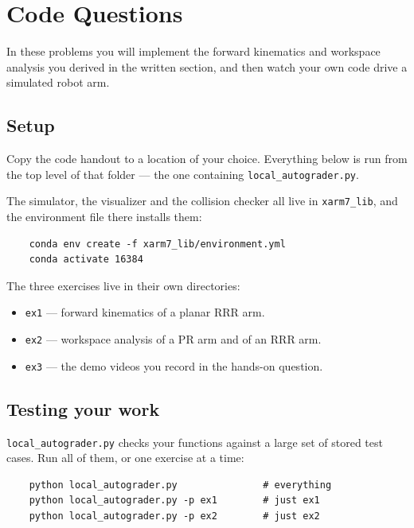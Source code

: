 \documentclass{16384_doc}
\begin{document}
\maketitle

\tableofcontents

\section{Code Questions}

In these problems you will implement the forward kinematics and workspace
analysis you derived in the written section, and then watch your own code drive
a simulated robot arm.

\subsection*{Setup}

Copy the code handout to a location of your choice. Everything below is run
from the top level of that folder --- the one containing
\verb!local_autograder.py!.

The simulator, the visualizer and the collision checker all live in
\verb!xarm7_lib!, and the environment file there installs them:

\begin{verbatim}
    conda env create -f xarm7_lib/environment.yml
    conda activate 16384
\end{verbatim}

The three exercises live in their own directories:

\begin{itemize}
    \item \verb!ex1! --- forward kinematics of a planar RRR arm.
    \item \verb!ex2! --- workspace analysis of a PR arm and of an RRR arm.
    \item \verb!ex3! --- the demo videos you record in the hands-on question.
\end{itemize}

\subsection*{Testing your work}

\verb!local_autograder.py! checks your functions against a large set of stored
test cases. Run all of them, or one exercise at a time:

\begin{verbatim}
    python local_autograder.py               # everything
    python local_autograder.py -p ex1        # just ex1
    python local_autograder.py -p ex2        # just ex2
\end{verbatim}
\end{document}
